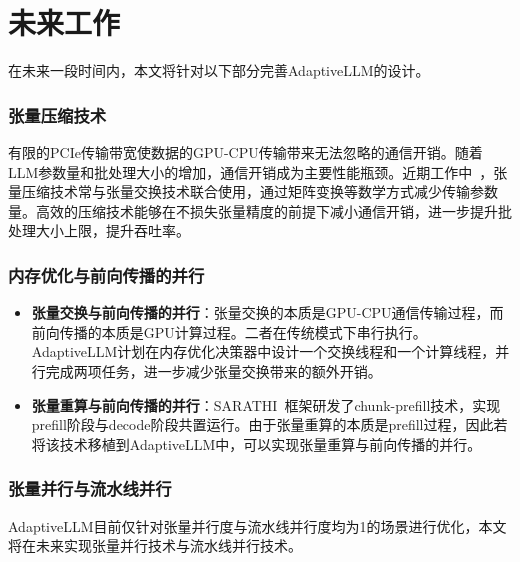 \section{未来工作}

在未来一段时间内，本文将针对以下部分完善AdaptiveLLM的设计。

\subsubsection{张量压缩技术}

有限的PCIe传输带宽使数据的GPU-CPU传输带来无法忽略的通信开销。随着LLM参数量和批处理大小的增加，通信开销成为主要性能瓶颈。近期工作中~\cite{Swapping}，张量压缩技术常与张量交换技术联合使用，通过矩阵变换等数学方式减少传输参数量。高效的压缩技术能够在不损失张量精度的前提下减小通信开销，进一步提升批处理大小上限，提升吞吐率。

\subsubsection{内存优化与前向传播的并行}

\begin{itemize}

  \item \textbf{张量交换与前向传播的并行}：张量交换的本质是GPU-CPU通信传输过程，而前向传播的本质是GPU计算过程。二者在传统模式下串行执行。AdaptiveLLM计划在内存优化决策器中设计一个交换线程和一个计算线程，并行完成两项任务，进一步减少张量交换带来的额外开销。

  \item \textbf{张量重算与前向传播的并行}：SARATHI~\cite{SARATHI}框架研发了chunk-prefill技术，实现prefill阶段与decode阶段共置运行。由于张量重算的本质是prefill过程，因此若将该技术移植到AdaptiveLLM中，可以实现张量重算与前向传播的并行。

\end{itemize}

\subsubsection{张量并行与流水线并行~\cite{Parallelism}} AdaptiveLLM目前仅针对张量并行度与流水线并行度均为1的场景进行优化，本文将在未来实现张量并行技术与流水线并行技术。